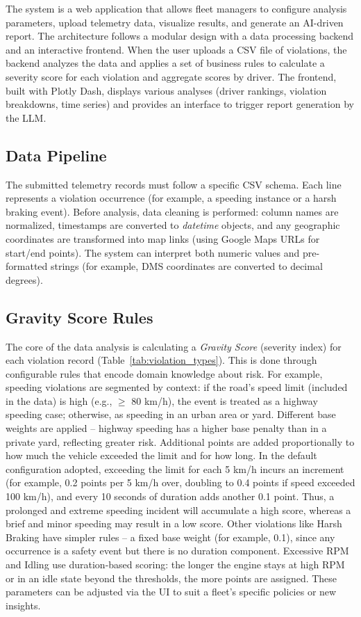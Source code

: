 \documentclass[12pt]{article}
\begin{document}
The system is a web application that allows fleet managers to configure analysis parameters, upload telemetry data, visualize results, and generate an AI-driven report. The architecture follows a modular design with a data processing backend and an interactive frontend. When the user uploads a CSV file of violations, the backend analyzes the data and applies a set of business rules to calculate a severity score for each violation and aggregate scores by driver. The frontend, built with Plotly Dash, displays various analyses (driver rankings, violation breakdowns, time series) and provides an interface to trigger report generation by the LLM.

\subsection{Data Pipeline}

The submitted telemetry records must follow a specific CSV schema. Each line represents a violation occurrence (for example, a speeding instance or a harsh braking event). Before analysis, data cleaning is performed: column names are normalized, timestamps are converted to \textit{datetime} objects, and any geographic coordinates are transformed into map links (using Google Maps URLs for start/end points). The system can interpret both numeric values and pre-formatted strings (for example, DMS coordinates are converted to decimal degrees).

\subsection{Gravity Score Rules}

The core of the data analysis is calculating a \textit{Gravity Score} (severity index) for each violation record (Table~\ref{tab:violation_types}). This is done through configurable rules that encode domain knowledge about risk. For example, speeding violations are segmented by context: if the road’s speed limit (included in the data) is high (e.g., $\geq$ 80 km/h), the event is treated as a highway speeding case; otherwise, as speeding in an urban area or yard. Different base weights are applied – highway speeding has a higher base penalty than in a private yard, reflecting greater risk. Additional points are added proportionally to how much the vehicle exceeded the limit and for how long. In the default configuration adopted, exceeding the limit for each 5 km/h incurs an increment (for example, 0.2 points per 5 km/h over, doubling to 0.4 points if speed exceeded 100 km/h), and every 10 seconds of duration adds another 0.1 point. Thus, a prolonged and extreme speeding incident will accumulate a high score, whereas a brief and minor speeding may result in a low score. Other violations like Harsh Braking have simpler rules – a fixed base weight (for example, 0.1), since any occurrence is a safety event but there is no duration component. Excessive RPM and Idling use duration-based scoring: the longer the engine stays at high RPM or in an idle state beyond the thresholds, the more points are assigned. These parameters can be adjusted via the UI to suit a fleet’s specific policies or new insights.
\end{document}
